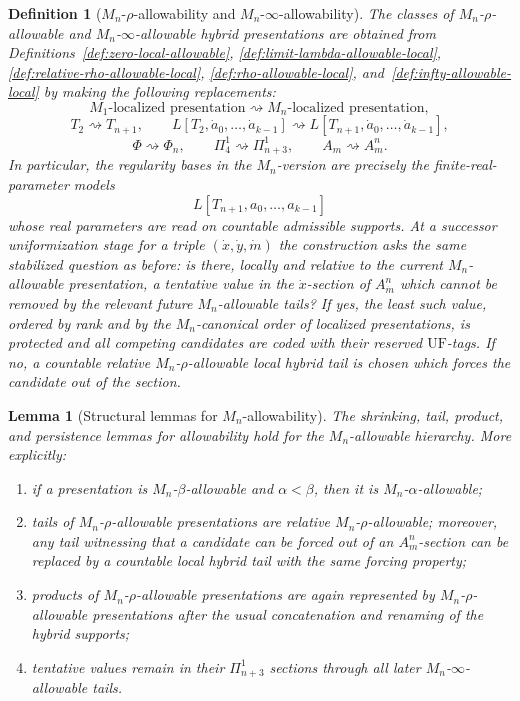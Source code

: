 \documentclass[a4paper,11pt]{article}
\newtheorem{lemma}[theorem]{Lemma}
\newtheorem{definition}[theorem]{Definition}
\begin{document}
\begin{definition}[$M_n$-$\rho$-allowability and $M_n$-$\infty$-allowability]\label{def:mn-rho-infty-allowability}
The classes of $M_n$-$\rho$-allowable and $M_n$-$\infty$-allowable hybrid presentations are obtained from Definitions~\ref{def:zero-local-allowable}, \ref{def:limit-lambda-allowable-local}, \ref{def:relative-rho-allowable-local}, \ref{def:rho-allowable-local}, and~\ref{def:infty-allowable-local} by making the following replacements:
\[
   M_1\text{-localized presentation}
\rightsquigarrow M_n\text{-localized presentation},
\]
\[
   T_2\rightsquigarrow T_{n+1},
   \qquad
   L[T_2,\dot a_0,\ldots,\dot a_{k-1}]
   \rightsquigarrow
   L[T_{n+1},\dot a_0,\ldots,\dot a_{k-1}],
\]
\[
   \Phi\rightsquigarrow\Phi_n,
   \qquad
   \Pi^1_4\rightsquigarrow\Pi^1_{n+3},
   \qquad
   A_m\rightsquigarrow A^n_m.
\]
In particular, the regularity bases in the $M_n$-version are precisely the finite-real-parameter models
\[
   L[T_{n+1},a_0,\ldots,a_{k-1}]
\]
whose real parameters are read on countable admissible supports.
At a successor uniformization stage for a triple $(\dot x,\dot y,\dot m)$ the construction asks the same stabilized question as before: is there, locally and relative to the current $M_n$-allowable presentation, a tentative value in the $\dot x$-section of $A^n_{\dot m}$ which cannot be removed by the relevant future $M_n$-allowable tails?  If yes, the least such value, ordered by rank and by the $M_n$-canonical order of localized presentations, is protected and all competing candidates are coded with their reserved $\mathrm{UF}$-tags.  If no, a countable relative $M_n$-$\rho$-allowable local hybrid tail is chosen which forces the candidate out of the section.
\end{definition}

\begin{lemma}[Structural lemmas for $M_n$-allowability]\label{lem:mn-allowability-structural-lemmas}
The shrinking, tail, product, and persistence lemmas for allowability hold for the $M_n$-allowable hierarchy.  More explicitly:
\begin{enumerate}
   \item if a presentation is $M_n$-$\beta$-allowable and $\alpha<\beta$, then it is $M_n$-$\alpha$-allowable;
   \item tails of $M_n$-$\rho$-allowable presentations are relative $M_n$-$\rho$-allowable; moreover, any tail witnessing that a candidate can be forced out of an $A^n_m$-section can be replaced by a countable local hybrid tail with the same forcing property;
   \item products of $M_n$-$\rho$-allowable presentations are again represented by $M_n$-$\rho$-allowable presentations after the usual concatenation and renaming of the hybrid supports;
   \item tentative values remain in their $\Pi^1_{n+3}$ sections through all later $M_n$-$\infty$-allowable tails.
\end{enumerate}
\end{lemma}
\end{document}
